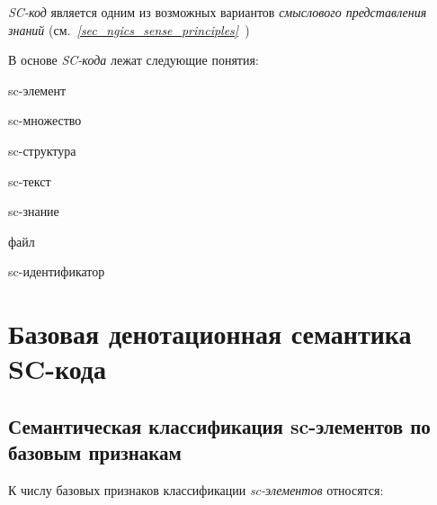 \textit{SC-код} является одним из возможных вариантов \textit{смыслового представления знаний} (см.\textit{~\ref{sec_ngics_sense_principles}~}) 

В основе \textit{SC-кода} лежат следующие понятия:
\begin{textitemize}
	\item{sc-элемент}
	\item{sc-множество}
	\item{sc-структура}
	\item{sc-текст}
	\item{sc-знание}
	\item{файл}
	\item{sc-идентификатор}
\end{textitemize}

\section{Базовая денотационная семантика SC-кода}
\label{sec_sr_scdsemantics}
	
%		
%		
%		
%		


\subsection{Семантическая классификация sc-элементов по базовым признакам}
\label{sec_semantic_classification_sc-elements}
К числу базовых признаков классификации \textit{sc-элементов} относятся:

